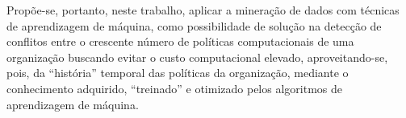 \documentclass[
	12pt,				%
	openright,			%
	oneside,			%
	a4paper,			%
	english,			%
	french,				%
	spanish,			%
	brazil				%
	]{abntex2}
\begin{document}
Propõe-se, portanto, neste trabalho, aplicar a mineração de dados com técnicas de aprendizagem de máquina, como possibilidade de solução na detecção de conflitos entre o crescente número de políticas computacionais de uma organização %
buscando evitar o custo computacional elevado, aproveitando-se, pois, da ``história'' temporal das políticas da organização, mediante o conhecimento adquirido, ``treinado'' e otimizado pelos algoritmos de aprendizagem de máquina. %

\end{document}
